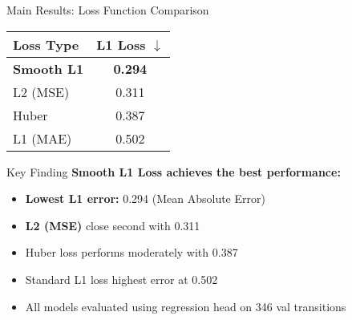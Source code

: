 \documentclass[aspectratio=169]{beamer}
\begin{document}
\begin{frame}{Main Results: Loss Function Comparison}
\begin{table}
\centering
\large
\begin{tabular}{lc}
\toprule
\textbf{Loss Type} & \textbf{L1 Loss} $\downarrow$ \\
\midrule
\rowcolor{green!20}
\textbf{Smooth L1} & \textbf{0.294} \\
L2 (MSE) & 0.311 \\
Huber & 0.387 \\
L1 (MAE) & 0.502 \\
\bottomrule
\end{tabular}
\end{table}

\vspace{0.5cm}
\begin{block}{Key Finding}
\textbf{Smooth L1 Loss achieves the best performance:}
\begin{itemize}
    \item \textbf{Lowest L1 error:} 0.294 (Mean Absolute Error)
    \item \textbf{L2 (MSE)} close second with 0.311
    \item Huber loss performs moderately with 0.387
    \item Standard L1 loss highest error at 0.502
    \item All models evaluated using regression head on 346 val transitions
\end{itemize}
\end{block}
\end{frame}
\end{document}
